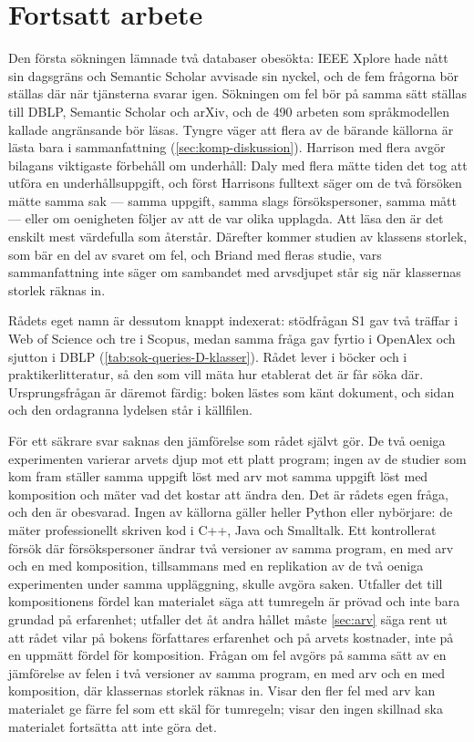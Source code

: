 \section{Fortsatt arbete}
\label{sec:komp-fortsatt}

Den första sökningen lämnade två databaser obesökta: IEEE Xplore hade
nått sin dagsgräns och Semantic Scholar avvisade sin nyckel, och de fem
frågorna bör ställas där när tjänsterna svarar igen.  Sökningen om fel
bör på samma sätt ställas till DBLP, Semantic Scholar och arXiv, och de
490 arbeten som språkmodellen kallade angränsande bör läsas.  Tyngre
väger att flera av de bärande källorna är lästa bara i sammanfattning
(\cref{sec:komp-diskussion}).  Harrison med flera avgör bilagans
viktigaste förbehåll om underhåll\autocite{Harrison2000}: Daly med flera
mätte tiden det tog att utföra en underhållsuppgift\autocite[113]{Daly1996},
och först Harrisons fulltext säger om de två försöken mätte samma sak
--- samma uppgift, samma slags försökspersoner, samma mått --- eller om
oenigheten följer av att de var olika upplagda.  Att läsa den är det
enskilt mest värdefulla som återstår.  Därefter kommer studien av
klassens storlek\autocite{ElEmam2001Confounding}, som bär en del av
svaret om fel, och Briand med fleras studie\autocite{Briand2000Exploring},
vars sammanfattning inte säger om sambandet med arvsdjupet står sig när
klassernas storlek räknas in.

Rådets eget namn är dessutom knappt indexerat: stödfrågan S1 gav två
träffar i Web of Science och tre i Scopus, medan samma fråga gav fyrtio
i OpenAlex och sjutton i DBLP (\cref{tab:sok-queries-D-klasser}).  Rådet lever
i böcker och i praktikerlitteratur, så den som vill mäta hur etablerat det
är får söka där.  Ursprungsfrågan är däremot färdig: boken lästes som
känt dokument, och sidan och den ordagranna lydelsen står i källfilen.

För ett säkrare svar saknas den jämförelse som rådet självt gör.  De två
oeniga experimenten varierar arvets djup mot ett platt program; ingen av
de studier som kom fram ställer samma uppgift löst med arv mot samma
uppgift löst med komposition och mäter vad det kostar att ändra den.
Det är rådets egen fråga, och den är obesvarad.  Ingen av källorna
gäller heller Python eller nybörjare: de mäter professionellt skriven
kod i C++, Java och Smalltalk.  Ett kontrollerat försök där
försökspersoner ändrar två versioner av samma program, en med arv och en
med komposition, tillsammans med en replikation av de två oeniga
experimenten under samma uppläggning, skulle avgöra saken.  Utfaller det
till kompositionens fördel kan materialet säga att tumregeln är prövad
och inte bara grundad på erfarenhet; utfaller det åt andra hållet måste
\cref{sec:arv} säga rent ut att rådet vilar på bokens
författares erfarenhet och på arvets kostnader, inte på en uppmätt
fördel för komposition.  Frågan om fel avgörs på samma sätt av en
jämförelse av felen i två versioner av samma program, en med arv och en
med komposition, där klassernas storlek räknas in.  Visar den fler fel
med arv kan materialet ge färre fel som ett skäl för tumregeln; visar
den ingen skillnad ska materialet fortsätta att inte göra det.

